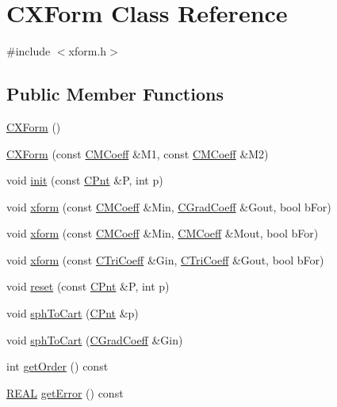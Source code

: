 \hypertarget{classCXForm}{\section{C\-X\-Form Class Reference}
\label{classCXForm}
}


{\ttfamily \#include $<$xform.\-h$>$}

\subsection*{Public Member Functions}
\begin{DoxyCompactItemize}
\item 
\hyperlink{classCXForm_a3079705401c30fcd28c9b6adc9fff542}{C\-X\-Form} ()
\item 
\hyperlink{classCXForm_ad2927e3f30011071f480639691c4a7fa}{C\-X\-Form} (const \hyperlink{classCMCoeff}{C\-M\-Coeff} \&M1, const \hyperlink{classCMCoeff}{C\-M\-Coeff} \&M2)
\item 
void \hyperlink{classCXForm_a9fe5afbc751e5d8a8d48aa20471c84a5}{init} (const \hyperlink{classCPnt}{C\-Pnt} \&P, int p)
\item 
void \hyperlink{classCXForm_aa86ee5b2fefaf70e9f914966555aa6ef}{xform} (const \hyperlink{classCMCoeff}{C\-M\-Coeff} \&Min, \hyperlink{classCGradCoeff}{C\-Grad\-Coeff} \&Gout, bool b\-For)
\item 
void \hyperlink{classCXForm_a1680a3a028017a27dea361e6af92f1fb}{xform} (const \hyperlink{classCMCoeff}{C\-M\-Coeff} \&Min, \hyperlink{classCMCoeff}{C\-M\-Coeff} \&Mout, bool b\-For)
\item 
void \hyperlink{classCXForm_a7c8028608cadb13dfa6320be661256d6}{xform} (const \hyperlink{classCTriCoeff}{C\-Tri\-Coeff} \&Gin, \hyperlink{classCTriCoeff}{C\-Tri\-Coeff} \&Gout, bool b\-For)
\item 
void \hyperlink{classCXForm_a4e9f8fd4d9fd24150cd357f724fa10c1}{reset} (const \hyperlink{classCPnt}{C\-Pnt} \&P, int p)
\item 
void \hyperlink{classCXForm_a092244b7fc2a15139d8aefac7600c549}{sph\-To\-Cart} (\hyperlink{classCPnt}{C\-Pnt} \&p)
\item 
void \hyperlink{classCXForm_abfae99a00642489f3431c8114112a608}{sph\-To\-Cart} (\hyperlink{classCGradCoeff}{C\-Grad\-Coeff} \&Gin)
\item 
int \hyperlink{classCXForm_afb77c0beb4e49769b0eadb717b2d1179}{get\-Order} () const 
\item 
\hyperlink{util_8h_a5821460e95a0800cf9f24c38915cbbde}{R\-E\-A\-L} \hyperlink{classCXForm_aa25c50b2811830ca8e54853a143e5dde}{get\-Error} () const 

\end{DoxyCompactItemize}
